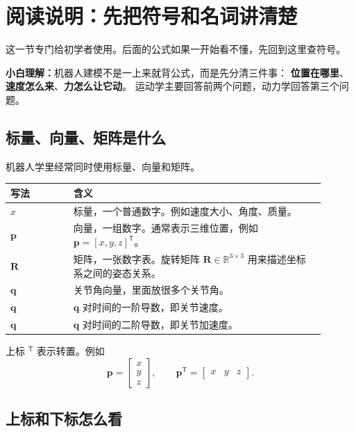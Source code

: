 \documentclass[UTF8,11pt,a4paper]{ctexart}
\newcommand{\R}{\mathbb{R}}
\newcommand{\T}{^{\mathsf T}}
\newcommand{\bs}[1]{\bm{#1}}
\begin{document}
\section{阅读说明：先把符号和名词讲清楚}

这一节专门给初学者使用。后面的公式如果一开始看不懂，先回到这里查符号。

\begin{answerbox}
\textbf{小白理解：}机器人建模不是一上来就背公式，而是先分清三件事：
\textbf{位置在哪里}、\textbf{速度怎么来}、\textbf{力怎么让它动}。
运动学主要回答前两个问题，动力学回答第三个问题。
\end{answerbox}

\subsection{标量、向量、矩阵是什么}

机器人学里经常同时使用标量、向量和矩阵。

\begin{center}
\begin{tabular}{p{0.18\linewidth}p{0.72\linewidth}}
\toprule
写法 & 含义 \\
\midrule
\(x\) & 标量，一个普通数字。例如速度大小、角度、质量。\\
\(\bs p\) & 向量，一组数字。通常表示三维位置，例如 \(\bs p=[x,y,z]\T\)。\\
\(\bs R\) & 矩阵，一张数字表。旋转矩阵 \(\bs R\in\R^{3\times 3}\) 用来描述坐标系之间的姿态关系。\\
\(\bs q\) & 关节角向量，里面放很多个关节角。\\
\(\dot{\bs q}\) & \(\bs q\) 对时间的一阶导数，即关节速度。\\
\(\ddot{\bs q}\) & \(\bs q\) 对时间的二阶导数，即关节加速度。\\
\bottomrule
\end{tabular}
\end{center}

上标 \({}^{\mathsf T}\) 表示转置。例如
\[
\bs p =
\begin{bmatrix}
x\\y\\z
\end{bmatrix},
\qquad
\bs p\T =
\begin{bmatrix}
x&y&z
\end{bmatrix}.
\]

\subsection{上标和下标怎么看}
\end{document}

